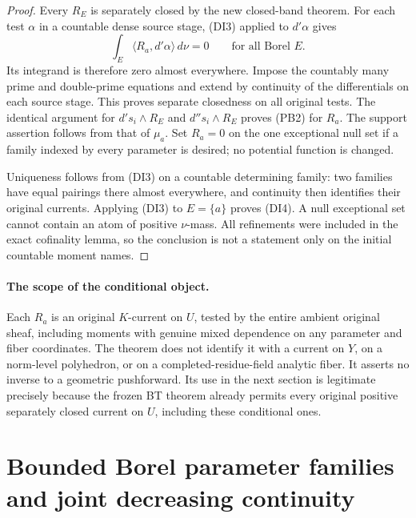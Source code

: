 \documentclass[11pt,a4paper]{article}
\numberwithin{equation}{section}
\theoremstyle{definition}
\theoremstyle{remark}
\begin{document}
\begin{proof}
Every $R_E$ is separately closed by the new closed-band theorem.
For each test $\alpha$ in a countable dense source stage,
(DI3) applied to $d'\alpha$ gives
\[
                      \int_E\langle R_a,d'\alpha\rangle\,d\nu=0
                           \qquad\text{for all Borel }E.
\]
Its integrand is therefore zero almost everywhere. Impose the
countably many prime and double-prime equations and extend by
continuity of the differentials on each source stage. This proves
separate closedness on all original tests. The identical argument
for $d's_i\wedge R_E$ and $d''s_i\wedge R_E$ proves (PB2) for
$R_a$. The support assertion follows from that of $\mu_a$.
Set $R_a=0$ on the one exceptional null set if a family indexed by
every parameter is desired; no potential function is changed.

Uniqueness follows from (DI3) on a countable determining family:
two families have equal pairings there almost everywhere, and
continuity then identifies their original currents. Applying (DI3)
to $E=\{a\}$ proves (DI4). A null exceptional set cannot contain
an atom of positive $\nu$-mass. All refinements were included in
the exact cofinality lemma, so the conclusion is not a statement
only on the initial countable moment names.
\end{proof}

\paragraph{The scope of the conditional object.}
Each $R_a$ is an original $K$-current on $U$, tested by the entire
ambient original sheaf, including moments with genuine mixed
dependence on any parameter and fiber coordinates. The theorem
does not identify it with a current on $Y$, on a norm-level
polyhedron, or on a completed-residue-field analytic fiber.
It asserts no inverse to a geometric pushforward. Its use in the
next section is legitimate precisely because the frozen BT theorem
already permits every original positive separately closed current
on $U$, including these conditional ones.



\section{Bounded Borel parameter families and joint decreasing continuity}
\label{sec:r12-bounded-borel-family-bt}
\end{document}
